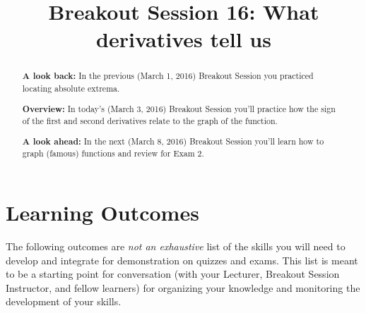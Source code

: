 \documentclass[handout,nooutcomes]{ximera}
\title{Breakout Session 16: What derivatives tell us}
\begin{document}
\begin{abstract}
  \textbf{A look back:} In the previous (March 1, 2016) Breakout Session you practiced locating absolute extrema.

  \textbf{Overview:} In today's (March 3, 2016) Breakout Session you'll practice how the sign of the first and second derivatives relate to the graph of the function.
  
  \textbf{A look ahead:} In the next (March 8, 2016) Breakout Session you'll learn how to graph (famous) functions and review for Exam 2.
\end{abstract}
\maketitle

\section{Learning Outcomes}
\label{section:learning-outcomes}
The following outcomes are \emph{not an exhaustive} list of the skills you will need to develop and integrate for demonstration on quizzes and exams.
This list is meant to be a starting point for conversation (with your Lecturer, Breakout Session Instructor, and fellow learners) for organizing your knowledge and monitoring the development of your skills.
\end{document}
